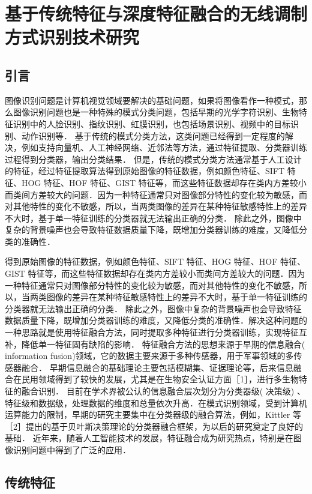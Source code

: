 
\chapter{基于传统特征与深度特征融合的无线调制方式识别技术研究}
\section{引言}
图像识别问题是计算机视觉领域要解决的基础问题，如果将图像看作一种模式，那么图像识别问题也是一种特殊的模式分类问题，包括早期的光学字符识别、生物特征识别中的人脸识别、指纹识别、虹膜识别，也包括场景识别、视频中的目标识别、动作识别等． 基于传统的模式分类方法，这类问题已经得到一定程度的解决，例如支持向量机、人工神经网络、近邻法等方法，通过特征提取、分类器训练过程得到分类器，输出分类结果． 但是，传统的模式分类方法通常基于人工设计的特征，经过特征提取算法得到原始图像的特征数据，例如颜色特征、SIFT 特征、HOG 特征、HOF 特征、GIST 特征等，而这些特征数据却存在类内方差较小而类间方差较大的问题．因为一种特征通常只对图像部分特性的变化较为敏感，而对其他特性的变化不敏感，所以，当两类图像的差异在某种特征敏感特性上的差异不大时，基于单一特征训练的分类器就无法输出正确的分类． 除此之外，图像中复杂的背景噪声也会导致特征数据质量下降，既增加分类器训练的难度，又降低分类的准确性．

得到原始图像的特征数据，例如颜色特征、SIFT 特征、HOG 特征、HOF 特征、GIST 特征等，而这些特征数据却存在类内方差较小而类间方差较大的问题．因为一种特征通常只对图像部分特性的变化较为敏感，而对其他特性的变化不敏感，所以，当两类图像的差异在某种特征敏感特性上的差异不大时，基于单一特征训练的分类器就无法输出正确的分类． 除此之外，图像中复杂的背景噪声也会导致特征数据质量下降，既增加分类器训练的难度，又降低分类的准确性．解决这种问题的一种思路就是使用特征融合方法，同时提取多种特征进行分类器训练，实现特征互补，降低单一特征固有缺陷的影响． 特征融合方法的思想来源于早期的信息融合( information fusion)领域，它的数据主要来源于多种传感器，用于军事领域的多传感器融合． 早期信息融合的基础理论主要包括模糊集、证据理论等，后来信息融合在民用领域得到了较快的发展，尤其是在生物安全认证方面［1］，进行多生物特征的融合识别． 目前在学术界被公认的信息融合层次划分为分类器级( 决策级) 、特征级和数据级，处理数据的维度和总量依次升高．在模式识别领域，受到计算机运算能力的限制，早期的研究主要集中在分类器级的融合算法，例如，Kittler
等［2］提出的基于贝叶斯决策理论的分类器融合框架，为以后的研究奠定了良好的基础． 近年来，随着人工智能技术的发展，特征融合成为研究热点，特别是在图像识别问题中得到了广泛的应用．

\section{传统特征}

